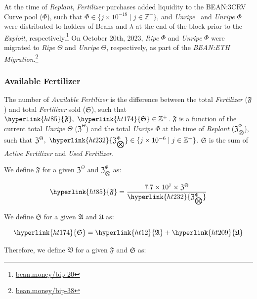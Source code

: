 \documentclass[tikz]{article}
\newcommand{\term}[1]{\textsl{#1}}
\newcommand{\fref}[1]{\footnote{\href{http://#1}{#1}}}
\newcommand{\Bean}{} %
\begin{document}
At the time of \term{Replant}, \term{Fertilizer} purchases added liquidity to the BEAN:3CRV Curve pool ($\Phi$), such that $\Phi \in \{j \times 10^{-18} \mid j \in \mathbb{Z}^{+} \}$, and \term{Unripe} \Bean\ and \term{Unripe} $\Phi$ were distributed to holders of Beans and $\lambda$ at the end of the block prior to the \term{Exploit}, respectively.\fref{bean.money/bip-20} On October 20th, 2023, \term{Ripe} $\Phi$ and \term{Unripe} $\Phi$ were migrated to \term{Ripe} $\Theta$ and \term{Unripe} $\Theta$, respectively, as part of the \term{BEAN:ETH Migration}.\fref{bean.money/bip-38}

\subsubsection{Available Fertilizer}

The number of \term{Available} \term{Fertilizer} is the difference between the total \term{Fertilizer} (\hyperlink{ht85}{$\mathfrak{F}$}) and total \term{Fertilizer} sold (\hyperlink{ht174}{$\mathfrak{S}$}), such that $\hyperlink{ht85}{\mathfrak{F}},\ \hyperlink{ht174}{\mathfrak{S}} \in \mathbb{Z}^{+}$. \hyperlink{ht85}{$\mathfrak{F}$} is a function of the current total \term{Unripe} $\Theta$ ($\mathfrak{Z}^{\Theta}$) and the total \term{Unripe} \hyperlink{ht187}{$\Phi$} at the time of \term{Replant} (\hyperlink{ht232}{$\mathfrak{Z}_{\bigotimes}^{\Phi}$}), such that $\mathfrak{Z}^{\Theta},\ \hyperlink{ht232}{\mathfrak{Z}_{\bigotimes}^{\Phi}} \in \{j \times 10^{-6} \mid j \in \mathbb{Z}^{+} \}$. \hyperlink{ht174}{$\mathfrak{S}$} is the sum of \term{Active} \term{Fertilizer} and \term{Used} \term{Fertilizer}.

We define \hyperlink{ht85}{$\mathfrak{F}$} for a given $\mathfrak{Z}^{\Theta}$ and \hyperlink{ht232}{$\mathfrak{Z}_{\bigotimes}^{\Phi}$} as:

    $$
        \hyperlink{ht85}{\mathfrak{F}} = \frac{7.7 \times 10^{7} \times \mathfrak{Z}^{\Theta}}
                                            {\hyperlink{ht232}{\mathfrak{Z}_{\bigotimes}^{\Phi}}}
    $$

We define \hyperlink{ht174}{$\mathfrak{S}$} for a given \hyperlink{ht12}{$\mathfrak{A}$} and \hyperlink{ht209}{$\mathfrak{U}$} as:

    $$
        \hyperlink{ht174}{\mathfrak{S}} = \hyperlink{ht12}{\mathfrak{A}} + \hyperlink{ht209}{\mathfrak{U}}
    $$
    
Therefore, we define \hyperlink{ht217}{$\mathfrak{V}$} for a given \hyperlink{ht85}{$\mathfrak{F}$} and \hyperlink{ht174}{$\mathfrak{S}$} as:
\end{document}
